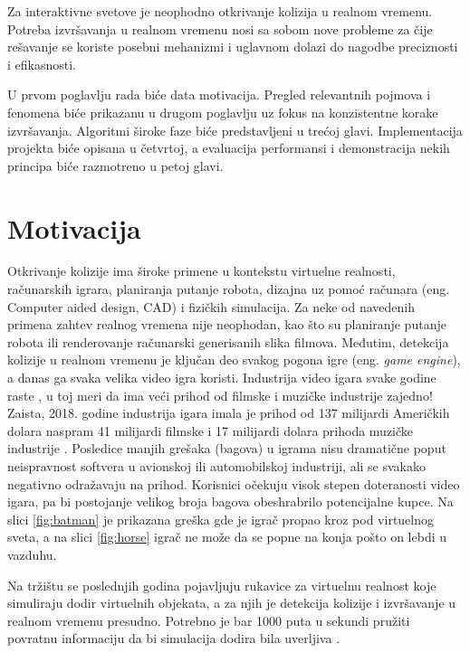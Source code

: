 \documentclass[12pt,oneside]{memoir}
\begin{document}
Za interaktivne svetove je neophodno otkrivanje kolizija u realnom vremenu. 
Potreba izvršavanja u realnom vremenu nosi sa sobom nove probleme za čije rešavanje se koriste posebni mehanizmi 
i uglavnom dolazi do nagodbe preciznosti i efikasnosti.

U prvom poglavlju rada biće data motivacija. 
Pregled relevantnih pojmova i fenomena biće prikazanu u drugom poglavlju uz fokus na konzistentne korake izvršavanja.
Algoritmi široke faze biće predstavljeni u trećoj glavi. 
Implementacija projekta biće opisana u četvrtoj, 
a evaluacija performansi i demonstracija nekih principa biće razmotreno u petoj glavi.

\section{Motivacija}
\label{sec:naslov1}
Otkrivanje kolizije ima široke primene u kontekstu virtuelne realnosti, računarskih igrara, planiranja putanje robota,
dizajna uz pomoć računara (eng. {Computer aided design, CAD}) i fizičkih simulacija. 
Za neke od navedenih primena zahtev realnog vremena nije neophodan, kao što su planiranje putanje robota ili renderovanje računarski generisanih slika filmova.
Međutim, detekcija kolizije u realnom vremenu je ključan deo svakog pogona igre (eng. {\em game engine}), a danas ga svaka velika
video igra koristi. Industrija video igara svake godine raste \cite{game_industry},
u toj meri da ima veći prihod od filmske i muzičke industrije zajedno! Zaista, 2018. godine industrija igara imala je prihod od
137 milijardi Američkih dolara naspram 41 milijardi filmske i 17 milijardi dolara prihoda muzičke industrije \cite{music, movie, game_industry}.
Posledice manjih grešaka (bagova) u igrama nisu dramatične poput neispravnost softvera u avionskoj ili automobilskoj industriji, ali 
se svakako negativno odražavaju na prihod.
Korisnici očekuju visok stepen doteranosti video igara, pa bi postojanje velikog broja bagova 
obeshrabrilo potencijalne kupce. Na slici \ref{fig:batman} je prikazana greška gde je igrač propao kroz
pod virtuelnog sveta, a na slici \ref{fig:horse} igrač ne može da se popne na konja pošto on lebdi u vazduhu.

Na tržištu se poslednjih godina pojavljuju rukavice za virtuelnu realnost koje simuliraju dodir virtuelnih objekata, a za njih je 
detekcija kolizije i izvršavanje u realnom vremenu presudno.
Potrebno je bar 1000 puta u sekundi pružiti povratnu informaciju da bi simulacija dodira bila uverljiva \cite{haptic}. 
\end{document}
